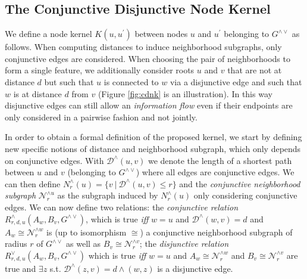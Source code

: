 \documentclass[review]{elsarticle}
\begin{document}
\subsection{The Conjunctive Disjunctive Node Kernel}

We define a node kernel $K(u,u^\prime)$ between  nodes $u$ and $u^\prime$ belonging to $G^{\wedge\vee}$ as follows.
When computing distances to induce neighborhood subgraphs, only conjunctive edges are considered. When choosing the
pair of neighborhoods to form a single feature, we additionally consider roots $u$ and $v$ that are not at distance $d$ but such that $u$ is connected to $w$ via a disjunctive edge and such that $w$ is at distance $d$ from $v$ (Figure \ref{fig:cdnk} is an illustration). In this way disjunctive edges can still allow an {\em information flow} even if their
endpoints are only considered in a pairwise fashion and not jointly. 

In order to obtain a formal definition of the proposed kernel, we start by defining new specific notions of distance and neighborhood subgraph, which only depends on conjunctive edges. With $\mathcal{D}^{\wedge}(u,v)$ we denote the  length of a shortest path between $u$ and $v$ (belonging to $G^{\wedge\vee}$) where all edges are conjunctive edges. We can then define $N^{\wedge}_r(u) = \lbrace v\ |\ \mathcal{D}^{\wedge}(u,v) \leq r \rbrace$
and the {\it conjunctive neighborhood subgraph} $\mathcal{N}_{r}^{\wedge u}$ as the  subgraph induced by $N^{\wedge}_r(u)$ only considering conjunctive edges. We can now define 
two relations: the \textit{conjunctive relation} $R^{\wedge}_{r,d,u}(A_w, B_v, G^{\wedge\vee})$, which is true 
{\em iff}  $w = u$ and $\mathcal{D}^{\wedge}(w,v)= d$ and $A_w \cong \mathcal{N}_r^{\wedge w}$ is (up to isomorphism $\cong$) a conjunctive neighborhood subgraph of radius $r$ of $G^{\wedge\vee}$ as well as $B_v \cong  \mathcal{N}_r^{\wedge v}$;
the \textit{disjunctive relation} $R_{r,d,u}^{\vee}(A_w, B_v, G^{\wedge\vee})$ which is true {\em iff} $w = u$ and $A_w \cong \mathcal{N}_r^{\wedge w}$ and $B_v \cong \mathcal{N}_r^{\wedge v}$ are true and $\exists z$ s.t. $\mathcal{D}^{\wedge}(z,v)= d \wedge (w,z)$ is a disjunctive edge. 
\end{document}
